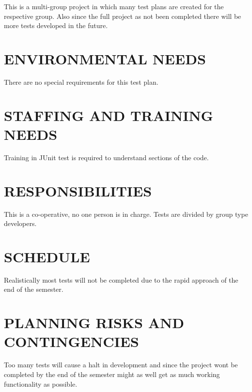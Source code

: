 {{{{\color{black}
This is a multi-group project in which many test plans are created for the respective group. Also since the full project as not been completed there will be more tests developed in the future. 
}

\section[ENVIRONMENTAL NEEDS]{\bfseries\color{black} ENVIRONMENTAL NEEDS}

{\color{black}
There are no special requirements for this test plan. 
}

\section[STAFFING AND TRAINING NEEDS]{\bfseries\color{black} STAFFING AND TRAINING NEEDS}
{\color{black}

{\color{black}
Training in JUnit test is required to understand sections of the code. 
}

\section[RESPONSIBILITIES]{\bfseries\color{black} RESPONSIBILITIES}
{\color{black}

{\color{black}
This is a co-operative, no one person is in charge. Tests are divided by group type developers. 
}

\section[SCHEDULE]{\bfseries\color{black} SCHEDULE}
{\color{black}


{\color{black}
Realistically most tests will not be completed due to the rapid approach of the end of the semester.  
}

\section[PLANNING RISKS AND CONTINGENCIES]{\bfseries\color{black} PLANNING RISKS AND CONTINGENCIES}

{\color{black}
Too many tests will cause a halt in development and since the project wont be completed by the end of the semester might as well get as much working functionality as possible. 
}

}}}}}}
